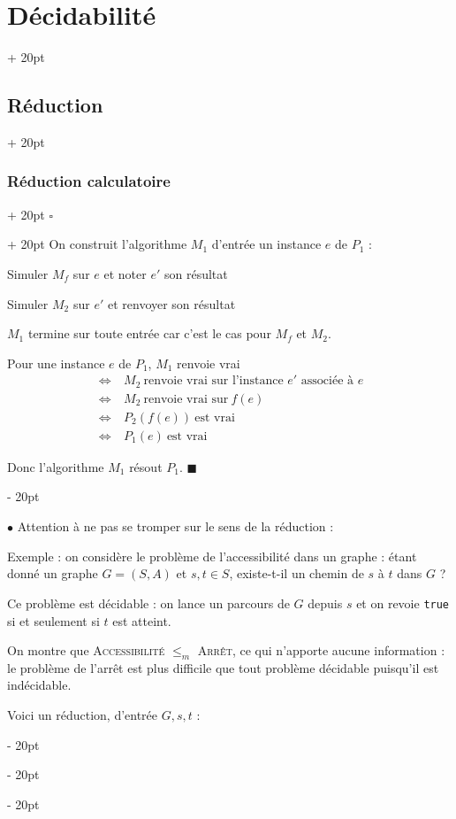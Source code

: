 \documentclass[a4paper, 12pt, twoside]{article}
\newenvironment{indalgo}[2][H]{
    \begin{algoBox}
        \begin{algorithm}[#1]
            \caption{#2}
}
{
        \end{algorithm}
    \end{algoBox}
}
\newcommand{\ssi}{\ \Leftrightarrow \ }
\renewcommand{\le}{\leqslant}
\newcommand{\ind}[1][20pt]{\advance\leftskip + #1}
\newcommand{\deind}[1][20pt]{\advance\leftskip - #1}
\newenvironment{indt}[2][20pt]{#2 \par \ind[#1]}{\par \deind} %
\newenvironment{proof}[1][{}]{\begin{indt}{$\square$ #1}}{$\blacksquare$ \end{indt}}
\begin{document}
\begin{indt}{\section{Décidabilité}}
\begin{indt}{\subsection{Réduction}}
\begin{indt}{\subsubsection{Réduction calculatoire}}
\begin{proof}
                    On construit l'algorithme $M_1$ d'entrée un instance $e$ de $P_1$ :

                    \begin{indalgo}{$M_1$}
                        Simuler $M_f$ sur $e$ et noter $e'$ son résultat\;

                        Simuler $M_2$ sur $e'$ et renvoyer son résultat\;
                    \end{indalgo}

                    $M_1$ termine sur toute entrée car c'est le cas pour $M_f$ et $M_2$.

                    Pour une instance $e$ de $P_1$, $M_1$ renvoie vrai
                    \[
                        \begin{array}{cl}
                            \ssi & M_2\ \text{renvoie vrai sur l'instance $e'$ associée à $e$}
                            \\
                            \ssi & M_2\ \text{renvoie vrai sur}\ f(e)
                            \\
                            \ssi & P_2(f(e)) \ \text{est vrai}
                            \\
                            \ssi & P_1(e) \ \text{est vrai}
                        \end{array}
                    \]

                    Donc l'algorithme $M_1$ résout $P_1$.
                \end{proof}

                \vspace{12pt}
                
                $\bullet$ Attention à ne pas se tromper sur le sens de la réduction : 

                Exemple : on considère le problème de l'accessibilité dans un graphe : étant donné un graphe $G = (S, A)$ et $s, t \in S$, existe-t-il un chemin de $s$ à $t$ dans $G$ ?

                Ce problème est décidable : on lance un parcours de $G$ depuis $s$ et on revoie \texttt{true} si et seulement si $t$ est atteint.

                On montre que \textsc{Accessibilité} $\le_m$ \textsc{Arrêt}, ce qui n'apporte aucune information : le problème de l'arrêt est plus difficile que tout problème décidable puisqu'il est indécidable.

                Voici un réduction, d'entrée $G, s, t$ :


\end{indt}
\end{indt}
\end{indt}
\end{document}
